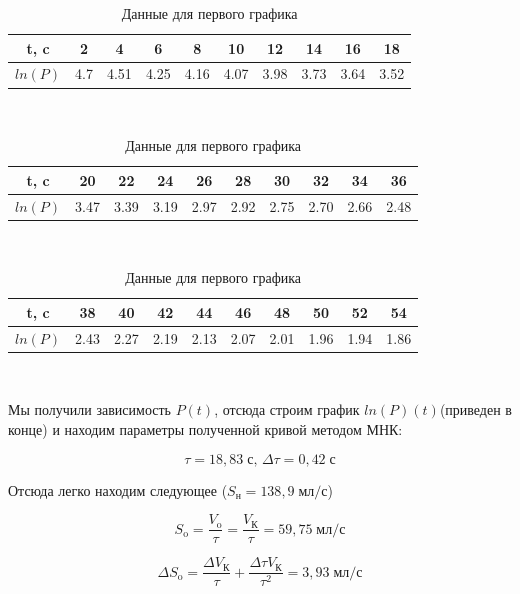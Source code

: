 \documentclass[a4paper, 12pt]{article} %
\begin{document}
\begin{table}[h]
	\begin{center}
		\begin{tabular}{| c | c | c | c | c | c | c | c | c | c |}
		\hline
		t, c    & 2   & 4    & 6    & 8    & 10   & 12   & 14   & 16   & 18   \\ \hline
		$ln(P)$ & 4.7 & 4.51 & 4.25 & 4.16 & 4.07 & 3.98 & 3.73 & 3.64 & 3.52 \\ \hline
		\end{tabular}\\
		
		\begin{tabular}{| c | c | c | c | c | c | c | c | c | c |}
		\hline
		t, c    & 20   & 22   & 24   & 26   & 28   & 30   & 32   & 34   & 36   \\ \hline
		$ln(P)$ & 3.47 & 3.39 & 3.19 & 2.97 & 2.92 & 2.75 & 2.70 & 2.66 & 2.48 \\ \hline
		\end{tabular}\\
		
		\begin{tabular}{| c | c | c | c | c | c | c | c | c | c |}
		\hline
		t, c    & 38   & 40   & 42   & 44   & 46   & 48   & 50   & 52   & 54   \\ \hline
		$ln(P)$ & 2.43 & 2.27 & 2.19 & 2.13 & 2.07 & 2.01 & 1.96 & 1.94 & 1.86 \\ \hline
		\end{tabular}\\
	\caption{Данные для первого графика}	
	\end{center}
\end{table}


Мы получили зависимость $P(t)$, отсюда строим график $ln(P)(t)$(приведен в конце) и находим параметры полученной кривой методом МНК:

\begin{equation}
	\tau = 18,83 \; \text{с, } \Delta \tau = 0,42 \; \text{с}
\end{equation}

Отсюда легко находим следующее ($S_{\text{н}} = 138,9 \; \text{мл/с}$)

\begin{equation}
	S_{\text{o}} = \frac{V_{\text{o}}}{\tau} = \frac{V_{\text{К}}}{\tau} = 59,75 \; \text{мл/с}
\end{equation}

\begin{equation}
	\Delta S_{\text{o}} = \frac{\Delta V_{\text{К}}}{\tau} + \frac{\Delta \tau V_{\text{К}}}{\tau^2} = 3,93 \; \text{мл/с}
\end{equation}
\end{document}
